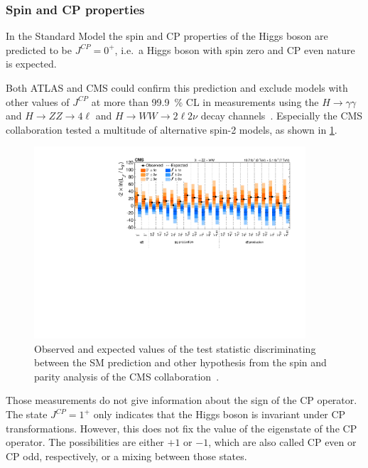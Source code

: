 \subsubsection{Spin and CP properties}\label{subsub:theory:meas:run1:cp}

In the Standard Model the spin and CP properties of the Higgs boson are predicted to be $J^{CP} = 0^+$, i.e.\ a Higgs boson with spin zero
and CP even nature is expected.

Both ATLAS and CMS could confirm this prediction and exclude models with other values of $J^{CP}$ at more than \SI{99.9}{\percent} CL
in measurements using the $H \to \gamma\gamma$ and $H\to ZZ \to 4\ell$ and $H \to WW \to 2\ell2\nu$ decay channels~\cite{HiggsCPATLAS,HiggsCPCMS}.
Especially the CMS collaboration tested a multitude of alternative spin-2 models, as shown in \cref{fig:theory:meas:run1:cp}.

\begin{figure}[htbp]
    \centering
    \includegraphics[width=0.9\textwidth]{./figures/theory/cp_cms_results.pdf}
    \caption{Observed and expected values of the test statistic discriminating between the SM
             prediction and other hypothesis from the spin and parity analysis of the CMS
             collaboration~\cite{HiggsCPCMS}.}\label{fig:theory:meas:run1:cp}
\end{figure}

Those measurements do not give information about the sign of the CP operator.
The state $J^{CP} = 1^+$ only indicates that the Higgs boson is invariant under CP transformations.
However, this does not fix the value of the eigenstate of the CP operator.
The possibilities are either $+1$ or $-1$, which are also called CP even or CP odd, respectively, or a mixing between those states.

